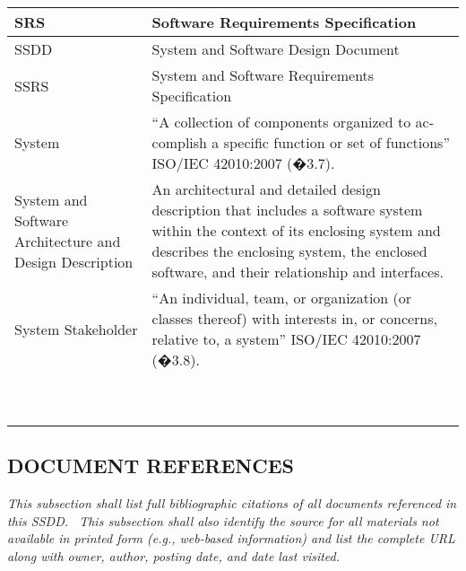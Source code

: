 \documentclass[twoside,letterpaper]{article}
\begin{document}
\begin{flushleft}
\begin{supertabular}{|m{1.3587599in}|m{5.00806in}|}
\color{black} SRS &
\color{black} Software Requirements
Specification\\\hline
{}\color{black} SSDD &
\color{black} System and Software Design
Document\\\hline
{}\color{black} SSRS &
\color{black} System and Software Requirements
Specification\\\hline
{}\color{black} System &
\color{black}
\foreignlanguage{english}{{\textquotedblleft}}\foreignlanguage{english}{A
collection of components organized to accomplish a specific function or
set of functions{\textquotedblright} ISO/IEC 42010:2007
(�3.7).}\\\hline
{}\color{black} System and Software Architecture
and Design Description &
\color{black} An architectural and detailed
design description that includes a software system within the context
of its enclosing system and describes the enclosing system, the
enclosed software, and their relationship and interfaces.\\\hline
{}\color{black} System Stakeholder &
\color{black}
\foreignlanguage{english}{{\textquotedblleft}}\foreignlanguage{english}{An
individual, team, or organization (or classes thereof) with interests
in, or concerns, relative to, a system{\textquotedblright} ISO/IEC
42010:2007 (�3.8).}\\\hline
~
 &
~
\\\hline
~
 &
~
\\\hline
\end{supertabular}
\end{flushleft}
\subsection[DOCUMENT
REFERENCES]{\bfseries\color{black} DOCUMENT
REFERENCES}
{\itshape\color{black}
This subsection shall list full bibliographic citations of all documents
referenced in this SSDD. \ This subsection shall also identify the
source for all materials not available in printed form (e.g., web-based
information) and list the complete URL along with owner, author,
posting date, and date last visited.}
\end{document}

